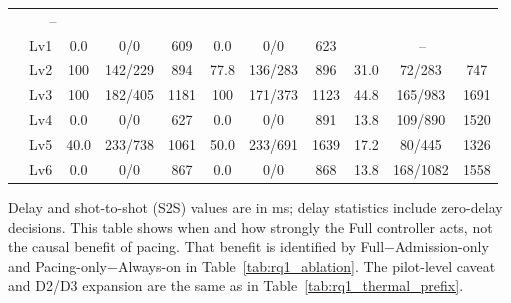 \begin{table}[t]
{\begin{tabular}{@{}c c || c c c | c c c | c c c@{}}
        \multicolumn{3}{c}{--} \\
      & Lv1 & 0.0 & 0/0 & 609 & 0.0 & 0/0 & 623 &
        \multicolumn{3}{c}{--} \\
      & Lv2 & 100 & 142/229 & 894 & 77.8 & 136/283 & 896 &
        31.0 & 72/283 & 747 \\
      & Lv3 & 100 & 182/405 & 1181 & 100 & 171/373 & 1123 &
        44.8 & 165/983 & 1691 \\
      & Lv4 & 0.0 & 0/0 & 627 & 0.0 & 0/0 & 891 &
        13.8 & 109/890 & 1520 \\
      & Lv5 & 40.0 & 233/738 & 1061 & 50.0 & 233/691 & 1639 &
        17.2 & 80/445 & 1326 \\
      & Lv6 & 0.0 & 0/0 & 867 & 0.0 & 0/0 & 868 &
        13.8 & 168/1082 & 1558 \\
    \bottomrule
  \end{tabular}%
  }
  \par\vspace{3pt}
  {\footnotesize Delay and shot-to-shot (S2S) values are in ms; delay statistics
  include zero-delay decisions. This table shows when and how strongly the Full
  controller acts, not the causal benefit of pacing. That benefit is identified
  by Full$-$Admission-only and Pacing-only$-$Always-on in
  Table~\ref{tab:rq1_ablation}. The pilot-level caveat and D2/D3 expansion are
  the same as in Table~\ref{tab:rq1_thermal_prefix}.}
\end{table}


